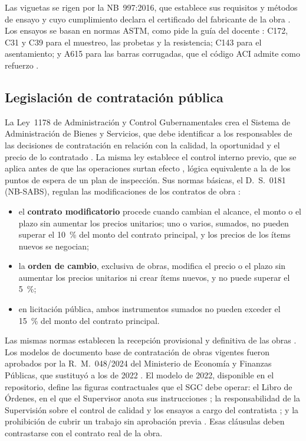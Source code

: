 Las viguetas se rigen por la NB~997:2016, que establece sus requisitos y métodos de ensayo \parencite{nb997_2016} y cuyo cumplimiento declara el certificado del fabricante de la obra \parencite{pretensa2025}. Los ensayos se basan en normas ASTM, como pide la guía del docente \parencite[diapositiva~25]{barrios2021documento}: C172, C31 y C39 para el muestreo, las probetas y la resistencia; C143 para el asentamiento; y A615 para las barras corrugadas, que el código ACI admite como refuerzo \parencite[sección~20.2.1.3, p.~409]{aci318_2025}.

\subsection{Legislación de contratación pública}

La Ley~1178 de Administración y Control Gubernamentales crea el Sistema de Administración de Bienes y Servicios, que debe identificar a los responsables de las decisiones de contratación en relación con la calidad, la oportunidad y el precio de lo contratado \parencite[art.~10]{ley1178_1990}. La misma ley establece el control interno previo, que se aplica antes de que las operaciones surtan efecto \parencite[arts.~13--14]{ley1178_1990}, lógica equivalente a la de los puntos de espera de un plan de inspección. Sus normas básicas, el D.~S.~0181 (NB-SABS), regulan las modificaciones de los contratos de obra \parencite[art.~89, pp.~91--93]{ds0181_2025compilado}:
\begin{itemize}
  \item el \textbf{contrato modificatorio} procede cuando cambian el alcance, el monto o el plazo sin aumentar los precios unitarios; uno o varios, sumados, no pueden superar el 10~\% del monto del contrato principal, y los precios de los ítems nuevos se negocian;
  \item la \textbf{orden de cambio}, exclusiva de obras, modifica el precio o el plazo sin aumentar los precios unitarios ni crear ítems nuevos, y no puede superar el 5~\%;
  \item en licitación pública, ambos instrumentos sumados no pueden exceder el 15~\% del monto del contrato principal.
\end{itemize}
Las mismas normas establecen la recepción provisional y definitiva de las obras \parencite[art.~39, p.~54]{ds0181_2025compilado}. Los modelos de documento base de contratación de obras vigentes fueron aprobados por la R.~M.~048/2024 del Ministerio de Economía y Finanzas Públicas, que sustituyó a los de 2022 \parencite{rm048_2024}. El modelo de 2022, disponible en el repositorio, define las figuras contractuales que el SGC debe operar: el Libro de Órdenes, en el que el Supervisor anota sus instrucciones \parencite[cláusula~25, p.~71]{dbc2022}; la responsabilidad de la Supervisión sobre el control de calidad y los ensayos a cargo del contratista \parencite[cláusulas~26.3 y 26.6, p.~73]{dbc2022}; y la prohibición de cubrir un trabajo sin aprobación previa \parencite[cláusula~26.10, p.~74]{dbc2022}. Esas cláusulas deben contrastarse con el contrato real de la obra.

